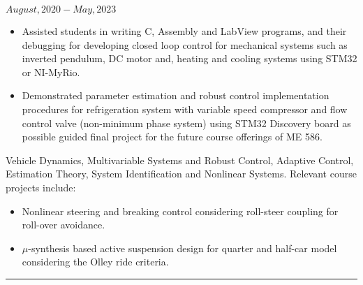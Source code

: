 \noindent {} \hfill $August, 2020 - May, 2023$
\begin{itemize}

        \item Assisted students in writing C, Assembly and LabView programs, and their debugging for developing closed loop control for mechanical systems such as inverted pendulum, DC motor and, heating and cooling systems using STM32 or NI-MyRio.

        \item {} Demonstrated parameter estimation and robust control implementation procedures for refrigeration system with variable speed compressor and flow control valve (non-minimum phase system) using STM32 Discovery board as possible guided final project for the future course offerings of ME 586.
\end{itemize}
\medskip
 Vehicle Dynamics, Multivariable Systems and Robust Control, Adaptive Control, Estimation Theory, System Identification and Nonlinear Systems. Relevant course projects include:
\begin{itemize}
        \item Nonlinear steering and breaking control considering roll-steer coupling for roll-over avoidance.
        \item $\mu$-synthesis based active suspension design for quarter and half-car model considering the Olley ride criteria.
\end{itemize}

\noindent\rule{\textwidth}{0.4pt}
